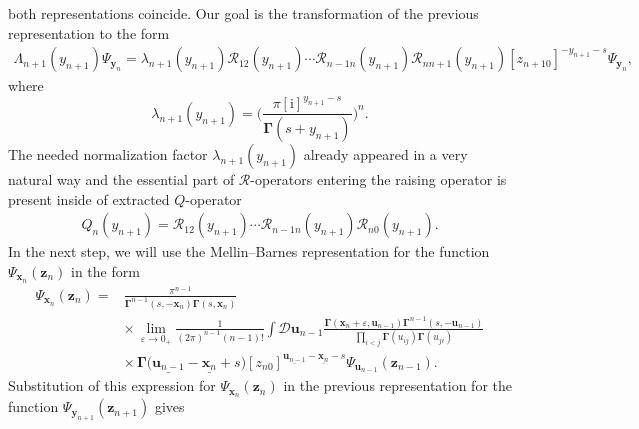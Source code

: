 \documentclass[10pt,a4paper]{amsart}
\renewcommand{\imath}{\mathrm{i}}
\numberwithin{equation}{section}
\begin{document}
both representations coincide.
Our goal is the transformation of the previous representation to the form
\begin{align*}
\Lambda_{n+1}(y_{n+1}) \Psi_{\bm{y}_{n}}
=
\lambda_{n+1}(y_{n+1}) \mathcal{R}_{12}(y_{n+1})\cdots
\mathcal{R}_{n-1 n}(y_{n+1})
\mathcal{R}_{n n+1}(y_{n+1}) [z_{n+1 0}]^{-y_{n+1}-s} \Psi_{\bm{y}_{n}} ,
\end{align*}
where
\begin{equation*}
\lambda_{n+1}(y_{n+1}) =
\biggl(\frac{\pi [\imath]^{y_{n+1}-s}}{\mathbf{\Gamma}(s+y_{n+1})}\biggr)^{n}.
\end{equation*}
The needed normalization factor $\lambda_{n+1}(y_{n+1})$ already appeared in a very natural way and the essential part of $\mathcal{R}$-operators entering
the raising operator is present inside of extracted $Q$-operator
\begin{align*}
Q_{n}(y_{n+1}) =
\mathcal{R}_{12}(y_{n+1})\cdots
\mathcal{R}_{n-1 n}(y_{n+1})
\mathcal{R}_{n 0}(y_{n+1}).
\end{align*}
In the next step, we will use the Mellin--Barnes representation for the function $\Psi_{\bm{x}_{n}}(\bm{z}_{n})$ in the form
\begin{align*}
\Psi_{\bm{x}_{n}}(\bm{z}_{n}) ={}&
\frac{\pi^{n-1}}{\mathbf{\Gamma}^{n-1}(s ,-\bm{x}_{n})
\mathbf{\Gamma}(s ,\bm{x}_{n})} \\
& {\times}\,
\lim\limits_{\varepsilon\to 0_+}
\frac{1}{(2\pi)^{n-1} (n-1)!} \int \mathcal{D}\bm{u}_{n-1}
\frac{\mathbf{\Gamma}(\bm x_{n}+\varepsilon,\bm u_{n-1})
\mathbf{\Gamma}^{n-1}(s ,-\bm{u}_{n-1})}
{\prod\limits_{i<j}\mathbf{\Gamma}(u_{ij})\mathbf{\Gamma}(u_{ji})} \\
& {\times}\,
\mathbf{\Gamma}\bigl(\underline{\bm{u}_{n-1}}-\underline{\bm{x}_{n}}+s\bigr)
[z_{n 0}]^{\underline{\bm{u}_{n-1}}-\underline{\bm{x}_{n}}-s}
\Psi_{\bm{u}_{n-1}}(\bm{z}_{n-1}) .
\end{align*}
Substitution of this expression for $\Psi_{\bm{x}_{n}}(\bm{z}_{n})$ in the previous
representation for the function $\Psi_{\bm{y}_{n+1}}(\bm{z}_{n+1})$ gives
\end{document}
